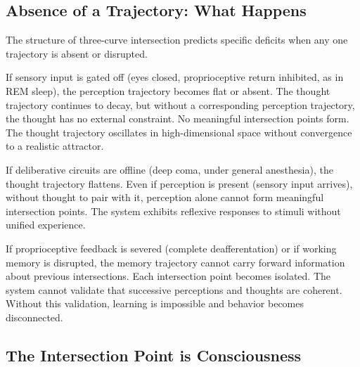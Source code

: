 \subsection{Absence of a Trajectory: What Happens}

The structure of three-curve intersection predicts specific deficits when any one trajectory is absent or disrupted.

\begin{proposition}
If sensory input is gated off (eyes closed, proprioceptive return inhibited, as in REM sleep), the perception trajectory becomes flat or absent. The thought trajectory continues to decay, but without a corresponding perception trajectory, the thought has no external constraint. No meaningful intersection points form. The thought trajectory oscillates in high-dimensional space without convergence to a realistic attractor.
\end{proposition}

\begin{proposition}
If deliberative circuits are offline (deep coma, under general anesthesia), the thought trajectory flattens. Even if perception is present (sensory input arrives), without thought to pair with it, perception alone cannot form meaningful intersection points. The system exhibits reflexive responses to stimuli without unified experience.
\end{proposition}

\begin{proposition}
If proprioceptive feedback is severed (complete deafferentation) or if working memory is disrupted, the memory trajectory cannot carry forward information about previous intersections. Each intersection point becomes isolated. The system cannot validate that successive perceptions and thoughts are coherent. Without this validation, learning is impossible and behavior becomes disconnected.
\end{proposition}

\subsection{The Intersection Point is Consciousness}

